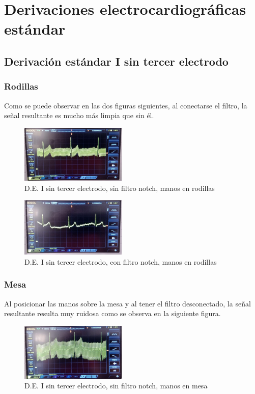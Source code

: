 \documentclass[conference]{IEEEtran}
\begin{document}
\section{Derivaciones electrocardiográficas estándar}
\subsection{Derivación estándar I sin tercer electrodo}
\subsubsection{Rodillas}
Como se puede observar en las dos figuras siguientes, al conectarse el filtro, la señal resultante es mucho más limpia que sin él.
\begin{figure}[H]
    \centerline{\includegraphics[width=0.45\textwidth]{d_SINelectrodo_SINnotch.jpg}}
    \caption{D.E. I sin tercer electrodo, sin filtro notch, manos en rodillas}
    \end{figure}
\begin{figure}[H]
    \centerline{\includegraphics[width=0.45\textwidth]{d_SINelectrodo_CONnotch.jpg}}
    \caption{D.E. I sin tercer electrodo, con filtro notch, manos en rodillas}
    \end{figure}

\subsubsection{Mesa}
Al posicionar las manos sobre la mesa y al tener el filtro desconectado, la señal resultante resulta muy ruidosa como se observa en la siguiente figura.
\begin{figure}[H]
    \centerline{\includegraphics[width=0.45\textwidth]{d_SINelectrodo_SINnotch_mesa.jpg}}
    \caption{D.E. I sin tercer electrodo, sin filtro notch, manos en mesa}
    \end{figure}
\end{document}
